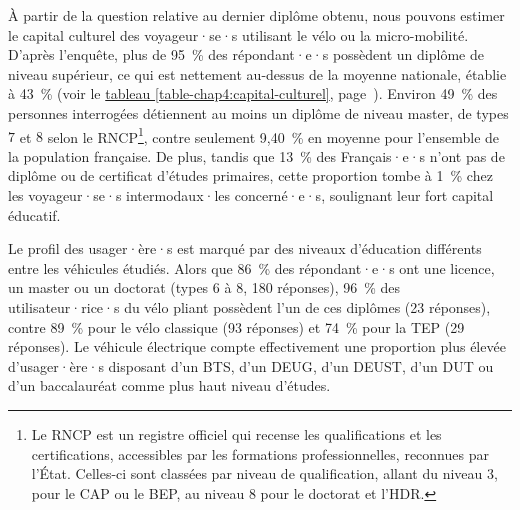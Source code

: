 \begin{refsegment}
À partir de la question relative au dernier diplôme obtenu, nous pouvons estimer le capital culturel des voyageur·se·s utilisant le vélo ou la micro-mobilité. D'après l'enquête, plus de 95~\% des répondant·e·s possèdent un diplôme de niveau supérieur, ce qui est nettement au-dessus de la moyenne nationale, établie à 43~\% (voir le \hyperref[table-chap4:capital-culturel]{tableau \ref{table-chap4:capital-culturel}}, page~\pageref{table-chap4:capital-culturel}). Environ 49~\% des personnes interrogées détiennent au moins un diplôme de niveau master, de types $7$ et $8$ selon le \acrfull{RNCP}\footnote{
    Le \acrfull{RNCP} est un registre officiel qui recense les qualifications et les certifications, accessibles par les formations professionnelles, reconnues par l'État. Celles-ci sont classées par niveau de qualification, allant du niveau $3$, pour le \acrshort{CAP} ou le \acrshort{BEP}, au niveau $8$ pour le doctorat et l'\acrshort{HDR}.
}, contre seulement 9,40~\% en moyenne pour l'ensemble de la population française. De plus, tandis que 13~\% des Français·e·s n'ont pas de diplôme ou de certificat d'études primaires, cette proportion tombe à 1~\% chez les voyageur·se·s intermodaux·les concerné·e·s, soulignant leur fort capital éducatif.%

Le profil des usager·ère·s est marqué par des niveaux d’éducation différents entre les véhicules étudiés. Alors que 86~\% des répondant·e·s ont une licence, un master ou un doctorat (types $6$ à $8$, 180 réponses), 96~\% des utilisateur·rice·s du vélo pliant possèdent l'un de ces diplômes (23 réponses), contre 89~\% pour le vélo classique (93 réponses) et 74~\% pour la \acrshort{TEP} (29 réponses). Le véhicule électrique compte effectivement une proportion plus élevée d’usager·ère·s disposant d'un \acrshort{BTS}, d'un \acrshort{DEUG}, d'un \acrshort{DEUST}, d'un \acrshort{DUT} ou d'un baccalauréat comme plus haut niveau d’études.%



\end{refsegment}
